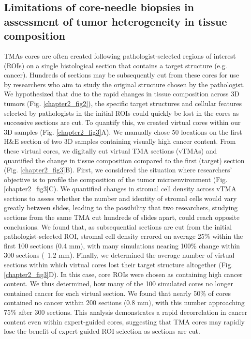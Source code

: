 \begin{refsection}
    \subsection{Limitations of core-needle biopsies in assessment of tumor heterogeneity in tissue composition}
    TMAs cores are often created following pathologist-selected regions of interest (ROIs) on a single histological section that contains a target structure (e.g. cancer). Hundreds of sections may be subsequently cut from these cores for use by researchers who aim to study the original structure chosen by the pathologist. We hypothesized that due to the rapid changes in tissue composition across 3D tumors (Fig. \ref{chapter2_fig2}), the specific target structures and cellular features selected by pathologists in the initial ROIs could quickly be lost in the cores as successive sections are cut. To quantify this, we created virtual cores within our 3D samples (Fig. \ref{chapter2_fig3}A). We manually chose 50 locations on the first H\&E section of two 3D samples containing visually high cancer content. From these virtual cores, we digitally cut virtual TMA sections (vTMAs) and quantified the change in tissue composition compared to the first (target) section (Fig. \ref{chapter2_fig3}B). 
    First, we considered the situation where researchers’ objective is to profile the composition of the tumor microenvironment (Fig. \ref{chapter2_fig3}C). We quantified changes in stromal cell density across vTMA sections to assess whether the number and identity of stromal cells would vary greatly between slides, leading to the possibility that two researchers, studying sections from the same TMA cut hundreds of slides apart, could reach opposite conclusions. We found that, as subsequential sections are cut from the initial pathologist-selected ROI, stromal cell density errored on average 25\% within the first 100 sections (0.4 mm), with many simulations nearing 100\% change within 300 sections (~1.2 mm). 
    Finally, we determined the average number of virtual sections within which virtual cores lost their target structure altogether (Fig. \ref{chapter2_fig3}D). In this case, core ROIs were chosen as containing high cancer content. We thus determined, how many of the 100 simulated cores no longer contained cancer for each virtual section. We found that nearly 50\% of cores contained no cancer within 200 sections (0.8 mm), with this number approaching 75\% after 300 sections. 
    This analysis demonstrates a rapid decorrelation in cancer content even within expert-guided cores, suggesting that TMA cores may rapidly lose the benefit of expert-guided ROI selection as sections are cut. 
    

\end{refsection}
